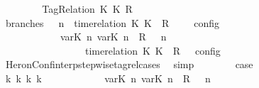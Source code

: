 \begin{isabellebody}
\ \ \isamarkupfalse%
\isanewline
\ \ \ \ \isamarkupfalse%
\ {\isacharparenleft}TagRelation\ K\ K\ R{\isacharparenright}\isanewline
\ \ \ \ \ \ \isamarkupfalse%
\ branches{\isacharcolon}\ {\isacartoucheopen}{\isasymlbrakk}\ {\isasymGamma}{\isacharcomma}\ n\ {\isasymturnstile}\ {\isacharparenleft}{\isacharparenleft}time{\isacharminus}relation\ {\isasymlfloor}K\ K\ {\isasymin}\ R{\isacharparenright}\ {\isacharhash}\ {\isasymPsi}{\isacharparenright}\ {\isasymtriangleright}\ {\isasymPhi}\ {\isasymrbrakk}\isactrlsub c\isactrlsub o\isactrlsub n\isactrlsub f\isactrlsub i\isactrlsub g\isanewline
\ \ \ \ \ \ \ \ \ \ {\isacharequal}\ {\isasymlbrakk}\ {\isacharparenleft}{\isacharparenleft}{\isasymlfloor}{\isasymtau}\isactrlsub v\isactrlsub a\isactrlsub r{\isacharparenleft}K\ n{\isacharparenright}{\isacharcomma}\ {\isasymtau}\isactrlsub v\isactrlsub a\isactrlsub r{\isacharparenleft}K\ n{\isacharparenright}{\isasymrfloor}\ {\isasymin}\ R{\isacharparenright}\ {\isacharhash}\ {\isasymGamma}{\isacharparenright}{\isacharcomma}\ n\isanewline
\ \ \ \ \ \ \ \ \ \ \ \ \ \ {\isasymturnstile}\ {\isasymPsi}\ {\isasymtriangleright}\ {\isacharparenleft}{\isacharparenleft}time{\isacharminus}relation\ {\isasymlfloor}K\ K\ {\isasymin}\ R{\isacharparenright}\ {\isacharhash}\ {\isasymPhi}{\isacharparenright}\ {\isasymrbrakk}\isactrlsub c\isactrlsub o\isactrlsub n\isactrlsub f\isactrlsub i\isactrlsub g{\isacartoucheclose}\isanewline
\ \ \ \ \ \ \ \ \isamarkupfalse%
\ HeronConf{\isacharunderscore}interp{\isacharunderscore}stepwise{\isacharunderscore}tagrel{\isacharunderscore}cases\ \isamarkupfalse%
\ simp\isanewline
\ \ \ \ \ \ \isamarkupfalse%
\ {\isacharquery}case\isanewline
\ \ \ \ \ \ \isamarkupfalse%
\ {\isacharminus}\isanewline
\ \ \ \ \ \ \ \ \isamarkupfalse%
\ {\isacartoucheopen}{\isasymexists}{\isasymGamma}\isactrlsub k\ {\isasymPsi}\isactrlsub k\ {\isasymPhi}\isactrlsub k\ k{\isachardot}\isanewline
\ \ \ \ \ \ \ \ \ \ \ \ {\isacharparenleft}{\isacharparenleft}{\isacharparenleft}{\isacharparenleft}{\isasymlfloor}{\isasymtau}\isactrlsub v\isactrlsub a\isactrlsub r{\isacharparenleft}K\ n{\isacharparenright}{\isacharcomma}\ {\isasymtau}\isactrlsub v\isactrlsub a\isactrlsub r{\isacharparenleft}K\ n{\isacharparenright}{\isasymrfloor}\ {\isasymin}\ R{\isacharparenright}\ {\isacharhash}\ {\isasymGamma}{\isacharparenright}{\isacharcomma}\ n\isanewline

\end{isabellebody}
